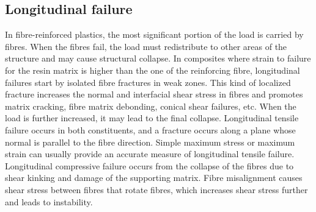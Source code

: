 \documentclass[12pt]{report}
\begin{document}
\subsection{Longitudinal failure}
\indent\indent\indent  In fibre-reinforced plastics, the most significant portion of the load is carried by fibres. When the fibres fail, the load must redistribute to other areas of the structure and may cause structural collapse. In composites where strain to failure for the resin matrix is higher than the one of the reinforcing fibre, longitudinal failures start by isolated fibre fractures in weak zones. This kind of localized fracture increases the normal and interfacial shear stress in fibres and promotes matrix cracking, fibre matrix debonding, conical shear failures, etc. When the load is further increased, it may lead to the final collapse. Longitudinal tensile failure occurs in both constituents, and a fracture occurs along a plane whose normal is parallel to the fibre direction. Simple maximum stress or maximum strain can usually provide an accurate measure of longitudinal tensile failure. Longitudinal compressive failure occurs from the collapse of the fibres due to shear kinking and damage of the supporting matrix. Fibre misalignment causes shear stress between fibres that rotate fibres, which increases shear stress further and leads to instability. 
 
\end{document}
